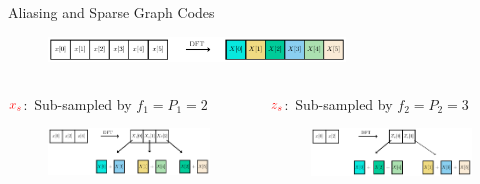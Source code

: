 	\begin{frame}{Aliasing and Sparse Graph Codes}
	
		\begin{block}{}
			\begin{figure}[t]
				\centering
				\includegraphics[width=3.1in]{./Figures/X_DFT}
			\end{figure}
		\end{block}
		
		\begin{columns}
			
			\column{.47\textwidth}
			\begin{block}{{\small $\color{red}x_s$:\ Sub-sampled by $f_1=P_1=2$}}
				\begin{figure}[t]
					\centering
					\includegraphics[width=2.3in]{./Figures/Xs}
				\end{figure}
			\end{block}
			
			\begin{block}{{\small$\color{red}z_s$:\ Sub-sampled by $f_2=P_2=3$}}
				\begin{figure}[t]
					\centering
					\includegraphics[width=2.3in]{./Figures/Zs}
				\end{figure}
			\end{block}
			

\end{columns}
\end{frame}
